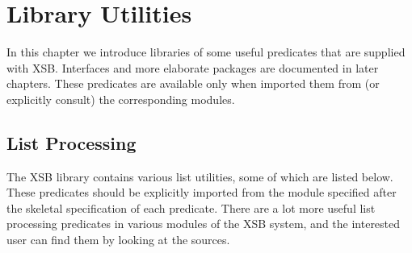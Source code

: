 \chapter{Library Utilities} \label{library_utilities}

In this chapter we introduce libraries of some useful predicates that
are supplied with XSB.  Interfaces and more elaborate packages are
documented in later chapters.  These predicates are available only
when imported them from (or explicitly consult) the corresponding
modules.


\section{List Processing}
The XSB library contains various list utilities, some of which 
are listed below.  These predicates should be explicitly imported from
the module specified after the skeletal specification of each predicate.
There are a lot more useful list processing predicates in various modules
of the XSB system, and the interested user can find them by 
looking at the sources.


